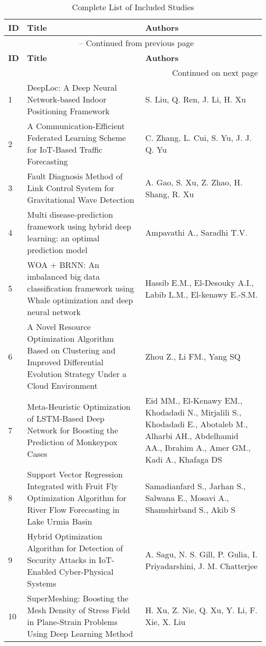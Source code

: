 \begin{landscape}
    \footnotesize
    \begin{longtable}{|p{0.5cm}|p{9cm}|p{7cm}|}
    \caption{Complete List of Included Studies}\label{tab:all_papers_compact}\\
    \hline
    \textbf{ID} & \textbf{Title} & \textbf{Authors} \\
    \hline
    \endfirsthead

    \multicolumn{3}{c}{\tablename\ \thetable{} -- Continued from previous page} \\
    \hline
    \textbf{ID} & \textbf{Title} & \textbf{Authors} \\
    \hline
    \endhead

    \hline
    \multicolumn{3}{r}{Continued on next page} \\
    \endfoot

    \hline
    \endlastfoot

    1 & DeepLoc: A Deep Neural Network-based Indoor Positioning Framework & S. Liu, Q. Ren, J. Li, H. Xu \\
    \hline
    2 & A Communication-Efficient Federated Learning Scheme for IoT-Based Traffic Forecasting & C. Zhang, L. Cui, S. Yu, J. J. Q. Yu \\
    \hline
    3 & Fault Diagnosis Method of Link Control System for Gravitational Wave Detection & A. Gao, S. Xu, Z. Zhao, H. Shang, R. Xu \\
    \hline
    4 & Multi disease-prediction framework using hybrid deep learning: an optimal prediction model & Ampavathi A., Saradhi T.V. \\
    \hline
    5 & WOA + BRNN: An imbalanced big data classification framework using Whale optimization and deep neural network & Hassib E.M., El-Desouky A.I., Labib L.M., El-kenawy E.-S.M. \\
    \hline
    6 & A Novel Resource Optimization Algorithm Based on Clustering and Improved Differential Evolution Strategy Under a Cloud Environment & Zhou Z., Li FM., Yang SQ \\
    \hline
    7 & Meta-Heuristic Optimization of LSTM-Based Deep Network for Boosting the Prediction of Monkeypox Cases & Eid MM., El-Kenawy EM., Khodadadi N., Mirjalili S., Khodadadi E., Abotaleb M., Alharbi AH., Abdelhamid AA., Ibrahim A., Amer GM., Kadi A., Khafaga DS \\
    \hline
    8 & Support Vector Regression Integrated with Fruit Fly Optimization Algorithm for River Flow Forecasting in Lake Urmia Basin & Samadianfard S., Jarhan S., Salwana E., Mosavi A., Shamshirband S., Akib S \\
    \hline
    9 & Hybrid Optimization Algorithm for Detection of Security Attacks in IoT-Enabled Cyber-Physical Systems & A. Sagu, N. S. Gill, P. Gulia, I. Priyadarshini, J. M. Chatterjee \\
    \hline
    10 & SuperMeshing: Boosting the Mesh Density of Stress Field in Plane-Strain Problems Using Deep Learning Method & H. Xu, Z. Nie, Q. Xu, Y. Li, F. Xie, X. Liu \\


\end{longtable}
\end{landscape}
